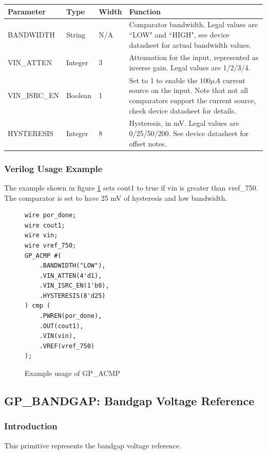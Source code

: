 \documentclass[11pt]{article}
\begin{document}
\begin{tabularx}{5in}{|l|l|l|X|}
\hline
{\bfseries Parameter} & {\bfseries Type} & {\bfseries Width} & {\bfseries Function} \\
\hline
BANDWIDTH & String & N/A &
	Comparator bandwidth. Legal values are ``LOW" and ``HIGH", see device datasheet for actual bandwidth values. \\
\hline
VIN\_ATTEN & Integer & 3 &
	Attenuation for the input, represented as inverse gain. Legal values are 1/2/3/4. \\
\hline
VIN\_ISRC\_EN & Boolean & 1 &
	Set to 1 to enable the $100 \mu A$ current source on the input. Note that not all comparators support the current
	source, check device datasheet for details.\\
\hline
HYSTERESIS & Integer & 8 &
	Hysteresis, in mV. Legal values are 0/25/50/200. See device datasheet for offset notes.\\
\hline
\end{tabularx}

\pagebreak
\subsubsection{Verilog Usage Example}

The example shown in figure \ref{gp-acmp-example} sets cout1 to true if vin is greater than vref\_750. The comparator is 
set to have 25 mV of hysteresis and low bandwidth.

\begin{figure}[h]
\begin{lstlisting}
wire por_done;
wire cout1;
wire vin;
wire vref_750;
GP_ACMP #(
	.BANDWIDTH("LOW"),
	.VIN_ATTEN(4'd1),
	.VIN_ISRC_EN(1'b0),
	.HYSTERESIS(8'd25)
) cmp (
	.PWREN(por_done),
	.OUT(cout1),
	.VIN(vin),
	.VREF(vref_750)
);
\end{lstlisting}
\caption{Example usage of GP\_ACMP}
\label{gp-acmp-example}
\end{figure}


\pagebreak
\clearpage
\subsection{GP\_BANDGAP: Bandgap Voltage Reference}

\subsubsection{Introduction}
This primitive represents the bandgap voltage reference.
\end{document}

